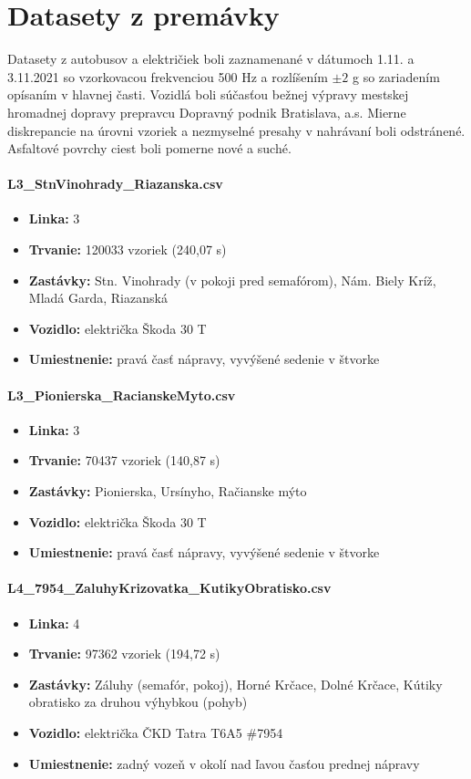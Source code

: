 \section{Datasety z premávky}
Datasety z autobusov a električiek boli zaznamenané v dátumoch 1.11. a 3.11.2021 so vzorkovacou frekvenciou 500 Hz 
a rozlíšením $\pm 2$ g so zariadením opísaním v hlavnej časti. Vozidlá boli súčasťou bežnej výpravy mestskej 
hromadnej dopravy prepravcu Dopravný podnik Bratislava, a.s. Mierne diskrepancie na úrovni vzoriek a nezmyselné 
presahy v nahrávaní boli odstránené. Asfaltové povrchy ciest boli pomerne nové a suché.

\paragraph{L3\_StnVinohrady\_Riazanska.csv}
\begin{itemize}[noitemsep, topsep=0pt]
  	\item \textbf{Linka:} 3
  	\item \textbf{Trvanie:} 120033 vzoriek (240,07 s)
  	\item \textbf{Zastávky:} Stn. Vinohrady (v pokoji pred semafórom), Nám. Biely Kríž, Mladá Garda, Riazanská
  	\item \textbf{Vozidlo:} električka Škoda 30 T
	\item \textbf{Umiestnenie:} pravá časť nápravy, vyvýšené sedenie v štvorke
\end{itemize}

\paragraph{L3\_Pionierska\_RacianskeMyto.csv}
\begin{itemize}[noitemsep, topsep=0pt]
  	\item \textbf{Linka:} 3
  	\item \textbf{Trvanie:} 70437 vzoriek (140,87 s)
  	\item \textbf{Zastávky:} Pionierska, Ursínyho, Račianske mýto
  	\item \textbf{Vozidlo:} električka Škoda 30 T
  	\item \textbf{Umiestnenie:} pravá časť nápravy, vyvýšené sedenie v štvorke
\end{itemize}

\paragraph{L4\_7954\_ZaluhyKrizovatka\_KutikyObratisko.csv}
	\begin{itemize}[noitemsep, topsep=0pt]
  	\item \textbf{Linka:} 4
  	\item \textbf{Trvanie:} 97362 vzoriek (194,72 s)
  	\item \textbf{Zastávky:} Záluhy (semafór, pokoj),  Horné Krčace, Dolné Krčace, Kútiky obratisko za druhou výhybkou (pohyb)
  	\item \textbf{Vozidlo:} električka ČKD Tatra T6A5 \#7954
  	\item \textbf{Umiestnenie:} zadný vozeň v okolí nad ľavou časťou prednej nápravy
  	\end{itemize}

